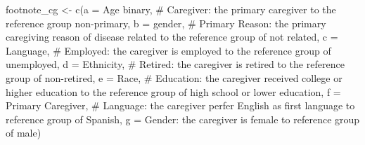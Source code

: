 \documentclass[
  letterpaper,
  DIV=11,
  numbers=noendperiod]{scrreprt}
\newenvironment{Shaded}{\begin{snugshade}}{\end{snugshade}}
\newcommand{\AttributeTok}[1]{\textcolor[rgb]{0.40,0.45,0.13}{#1}}
\newcommand{\CommentTok}[1]{\textcolor[rgb]{0.37,0.37,0.37}{#1}}
\newcommand{\FunctionTok}[1]{\textcolor[rgb]{0.28,0.35,0.67}{#1}}
\newcommand{\NormalTok}[1]{\textcolor[rgb]{0.00,0.23,0.31}{#1}}
\newcommand{\OtherTok}[1]{\textcolor[rgb]{0.00,0.23,0.31}{#1}}
\newcommand{\StringTok}[1]{\textcolor[rgb]{0.13,0.47,0.30}{#1}}
\begin{document}
\begin{Shaded}
\begin{Highlighting}[]
\NormalTok{footnote\_cg }\OtherTok{\textless{}{-}} 
  \FunctionTok{c}\NormalTok{(}\AttributeTok{a =} \StringTok{\textquotesingle{}Age binary\textquotesingle{}}\NormalTok{,}
      \CommentTok{\# \textquotesingle{}Caregiver: the primary caregiver to the reference group non{-}primary\textquotesingle{},}
    \AttributeTok{b =} \StringTok{\textquotesingle{}gender\textquotesingle{}}\NormalTok{,}
      \CommentTok{\# \textquotesingle{}Primary Reason: the primary caregiving reason of disease related to the reference group of not related\textquotesingle{},}
    \AttributeTok{c =} \StringTok{\textquotesingle{}Language\textquotesingle{}}\NormalTok{,}
      \CommentTok{\# \textquotesingle{}Employed: the caregiver is employed to the reference group of unemployed\textquotesingle{}, }
    \AttributeTok{d =} \StringTok{\textquotesingle{}Ethnicity\textquotesingle{}}\NormalTok{,}
      \CommentTok{\# \textquotesingle{}Retired: the caregiver is retired to the reference group of non{-}retired\textquotesingle{},}
    \AttributeTok{e =} \StringTok{\textquotesingle{}Race\textquotesingle{}}\NormalTok{,}
      \CommentTok{\# \textquotesingle{}Education: the caregiver received college or higher education to the reference group of high school or lower education\textquotesingle{}, }
    \AttributeTok{f =} \StringTok{\textquotesingle{}Primary Caregiver\textquotesingle{}}\NormalTok{,}
      \CommentTok{\# \textquotesingle{}Language: the caregiver perfer English as first language to reference group of Spanish\textquotesingle{},}
    \AttributeTok{g =} \StringTok{\textquotesingle{}Gender: the caregiver is female to reference group of male\textquotesingle{}}\NormalTok{)}


\end{Highlighting}
\end{Shaded}
\end{document}

